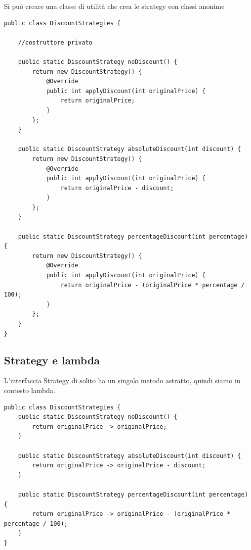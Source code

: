 Si può creare una classe di utilità che crea le strategy con classi anonime
\begin{lstlisting}
public class DiscountStrategies {

    //costruttore privato

    public static DiscountStrategy noDiscount() {
        return new DiscountStrategy() {
            @Override
            public int applyDiscount(int originalPrice) {
                return originalPrice;
            }
        };
    }

    public static DiscountStrategy absoluteDiscount(int discount) {
        return new DiscountStrategy() {
            @Override
            public int applyDiscount(int originalPrice) {
                return originalPrice - discount;
            }
        };
    }

    public static DiscountStrategy percentageDiscount(int percentage) {
        return new DiscountStrategy() {
            @Override
            public int applyDiscount(int originalPrice) {
                return originalPrice - (originalPrice * percentage / 100);
            }
        };
    }
}
\end{lstlisting}

\subsection{Strategy e lambda}

L’interfaccia Strategy di solito ha un singolo metodo astratto, quindi siamo in contesto lambda.
\begin{lstlisting}
public class DiscountStrategies {
    public static DiscountStrategy noDiscount() {
        return originalPrice -> originalPrice;
    }

    public static DiscountStrategy absoluteDiscount(int discount) {
        return originalPrice -> originalPrice - discount;
    }

    public static DiscountStrategy percentageDiscount(int percentage) {
        return originalPrice -> originalPrice - (originalPrice * percentage / 100);
    }
}
\end{lstlisting}